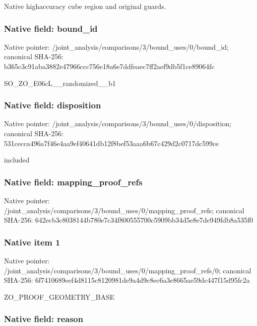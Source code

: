 \documentclass[10pt,a4paper]{article}
\begin{document}
Native highaccuracy cube region and original guards.


\subsubsection{Native field: bound\_id}


Native pointer: /joint\_analysis/comparis\allowbreak{}ons/3/bound\_uses/0/bound\allowbreak{}\_id; canonical SHA-256: b365c3c91aba3882e47966cc\allowbreak{}c756e18a6e7ddfeaec7ff2ae\allowbreak{}f9db5f1ce89064fc


SO\_ZO\_E06cL\_\_randomized\_\_b1


\subsubsection{Native field: disposition}


Native pointer: /joint\_analysis/comparis\allowbreak{}ons/3/bound\_uses/0/dispo\allowbreak{}sition; canonical SHA-256: 531cecca496a7f46e4aa9ef4\allowbreak{}0641db12f8bef53aaa6b67c4\allowbreak{}29d2c0717dc599ce


included


\subsubsection{Native field: mapping\_proof\_refs}


Native pointer: /joint\_analysis/comparis\allowbreak{}ons/3/bound\_uses/0/mappi\allowbreak{}ng\_proof\_refs; canonical SHA-256: 642ecb3c8038144b780e7c34\allowbreak{}f800555700c5909bb34d5e8e\allowbreak{}7de949fdb8a535f0



\subsubsection{Native item 1}


Native pointer: /joint\_analysis/comparis\allowbreak{}ons/3/bound\_uses/0/mappi\allowbreak{}ng\_proof\_refs/0; canonical SHA-256: 6f7410689eef4d8115c81209\allowbreak{}81de9a4d9c8ec6a3e8665ae5\allowbreak{}9dc447f15d95fc2a


ZO\_PROOF\_GEOMETRY\_BASE


\subsubsection{Native field: reason}
\end{document}
